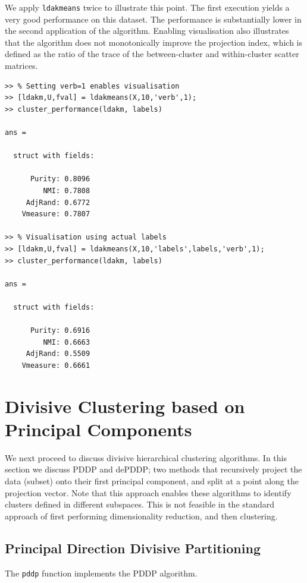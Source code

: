 \documentclass{book}
\begin{document}
We apply {\tt ldakmeans} twice to illustrate this point. The first execution yields a very good
performance on this dataset. The performance is substantially lower
in the second application of the algorithm. Enabling visualisation also
illustrates that the algorithm does not monotonically improve the
projection index, which is defined as the
ratio of the trace of the between-cluster and within-cluster scatter matrices.


\begin{lstlisting}
>> % Setting verb=1 enables visualisation
>> [ldakm,U,fval] = ldakmeans(X,10,'verb',1);
>> cluster_performance(ldakm, labels)

ans = 

  struct with fields:

      Purity: 0.8096
         NMI: 0.7808
     AdjRand: 0.6772
    Vmeasure: 0.7807

>> % Visualisation using actual labels
>> [ldakm,U,fval] = ldakmeans(X,10,'labels',labels,'verb',1);
>> cluster_performance(ldakm, labels)

ans = 

  struct with fields:

      Purity: 0.6916
         NMI: 0.6663
     AdjRand: 0.5509
    Vmeasure: 0.6661

\end{lstlisting}




\section{Divisive Clustering based on Principal Components}

We next proceed to discuss divisive hierarchical clustering algorithms.
%
In this section we discuss PDDP and dePDDP; two methods
that recursively project the data (subset) onto their first principal component, and split
at a point along the projection vector.
%
Note that this approach enables these algorithms to
identify clusters defined in different subspaces. This is not feasible in
the standard approach of first performing dimensionality
reduction, and then clustering.

\subsection{Principal Direction Divisive Partitioning}

The {\tt pddp} function implements the PDDP algorithm.
\end{document}
